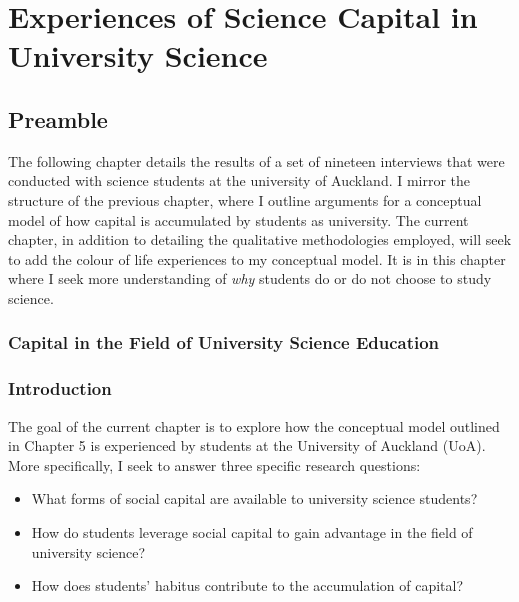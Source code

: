 \chapter{Experiences of Science Capital in University Science}

\section{Preamble}
The following chapter details the results of a set of nineteen interviews that were conducted with science students at the university of Auckland. I mirror the structure of the previous chapter, where I outline arguments for a conceptual model of how capital is accumulated by students as university. The current chapter, in addition to detailing the qualitative methodologies employed, will seek to add the colour of life experiences to my conceptual model. It is in this chapter where I seek more understanding of \textit{why} students do or do not choose to study science.

\subsection{Capital in the Field of University Science Education}



\subsection{Introduction}
The goal of the current chapter is to explore how the conceptual model outlined in Chapter 5 is experienced by students at the University of Auckland (UoA). More specifically, I seek to answer three specific research questions:
\begin{itemize}
    \item What forms of social capital are available to university science students? 
    \item How do students leverage social capital to gain advantage in the field of university science? 
    \item How does students' habitus contribute to the accumulation of capital?
\end{itemize}

